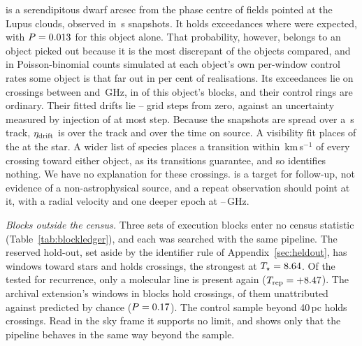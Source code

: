 \BkAlmaName{} is a serendipitous dwarf \TwPbJx{} arcsec from the phase
centre of fields pointed at the Lupus clouds, observed in \TwOnSrcJx\,s
snapshots. It holds \TwNExcJx{} exceedances where \TwExpCtrlJx{} were
expected, with $P=0.013$ for this object alone. That probability,
however, belongs to an object picked out because it is the most discrepant of
the \TwLookNStarCtrl{} objects compared, and in Poisson-binomial counts
simulated at each object's own per-window control rates some object is that
far out in \TwLookPctCtrl{} per cent of realisations. Its
\TwNExcJxWord{} exceedances lie on \TwJxNCrossExcWord{} crossings between
\TwJxExcBandLo{} and \TwJxExcBandHi\,GHz, in \TwJxNBlockExcWord{} of this
object's \TwJxNBlockWord{} blocks, and their control rings are ordinary.
Their fitted drifts lie \TwJxStepLo--\TwJxStepHi{} grid steps from zero,
against an uncertainty measured by injection of at most \TwJxStepErr{} step.
Because the snapshots are spread over a \TwJxSpanS\,s track,
$\eta_{\rm drift}$ is \TwJxEtaSpanRange{} over the track and \TwJxEtaOnRange{}
over the time on source. A visibility fit places \TwJxNLocalExcWord{} of the
\TwJxNCrossExcWord{} at the star. A wider list of \TwWideNSpecies{} species
places a transition within \TwWideDvMax\,km\,s$^{-1}$ of every crossing
toward either object, as its \TwWideNTrans{} transitions guarantee, and so
identifies nothing. We have no explanation for these crossings. \BkAlmaName{}
is a target for follow-up, not evidence of a non-astrophysical source, and a
repeat observation should point at it, with a radial velocity and one deeper
epoch at \TwJxExcBandLo--\TwJxExcBandHi\,GHz.

\label{sec:holdoutsearch}%
\emph{Blocks outside the census.} Three sets of execution blocks enter no
census statistic (Table~\ref{tab:blockledger}), and each was searched with
the same pipeline. The reserved hold-out, set aside by the identifier rule
of Appendix~\ref{sec:heldout}, has \HoNWin{} windows toward \HoNStar{} stars
and holds \HoNCross{} crossings, the strongest at $T_\star=8.64$. Of the \HoNTested{} tested for recurrence,
only a molecular line is present again ($T_{\rm rep}=+8.47$). The
archival extension's \LdgExtWin{} windows in \LdgExtEB{} blocks hold
\QxObsCross{} crossings, \QxObsUnattr{} of them unattributed against
\QxLam{} predicted by chance ($P=0.17$). The control sample beyond
40\,pc holds \OosNCross{} crossings. Read in the sky frame it supports no
limit, and shows only that the pipeline behaves in the same way beyond the
sample.

